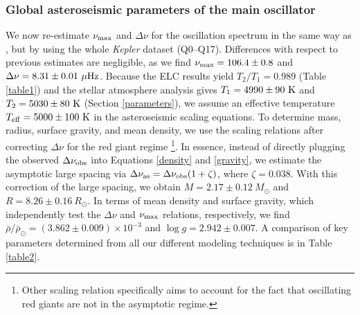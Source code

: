 \subsubsection{Global asteroseismic parameters of the main oscillator}
\label{subsubsec_main_osc}
We now re-estimate $\nu_{\rm{max}}$ and $\Delta \nu$ for the oscillation spectrum in the same way as \citet{gau14}, but by using the whole \textit{Kepler} dataset (Q0--Q17).  Differences with respect to previous estimates are negligible, as we find $\nu_{\rm{max}} = 106.4 \pm 0.8$ and $\Delta \nu = 8.31 \pm 0.01 \ \mu \rm{Hz}$. Because the ELC results yield $T_2/T_1=0.989$ (Table \ref{table1}) and the stellar atmosphere analysis gives $T_1 = 4990 \pm 90 \ \rm{K}$ and $T_2 = 5030 \pm 80 \ \rm{K}$ (Section \ref{parameters}), we assume an effective temperature $T_{\rm{eff}} = 5000 \pm 100 \ \rm{K}$ in the asteroseismic scaling equations. To determine mass, radius, surface gravity, and mean density, we use the scaling relations after correcting $\Delta \nu$ for the red giant regime \citep{mos13}\footnote{Other scaling relation  \citet{mos13} specifically aims to account for the fact that oscillating red giants are not in the asymptotic regime.}. In essence, instead of directly plugging the observed $\Delta \nu_{\rm{obs}}$ into Equations \ref{density} and \ref{gravity}, we estimate the asymptotic large spacing via $\Delta \nu_{\rm{as}} = \Delta \nu_{\rm{obs}} (1 + \zeta)$, where $\zeta = 0.038$. With this correction of the large spacing, we obtain $M = 2.17 \pm 0.12 \ M_{\odot}$ and $R = 8.26 \pm 0.16 \ R_{\odot}$. In terms of mean density and surface gravity, which independently test the $\Delta \nu$  and $\nu_{\rm{max}}$ relations, respectively, we find $\bar{\rho}/\bar{\rho}_{\odot} = (3.862 \pm 0.009) \times 10 ^{-3}$ and $\log g = 2.942 \pm 0.007$. A comparison of key parameters determined from all our different modeling techniques is in Table \ref{table2}.

